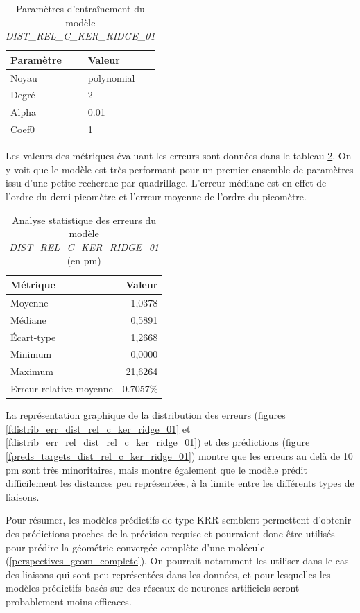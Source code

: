 \begin{table}
	\centering
	\begin{tabular}{|l|l|}
		\hline
		\textbf{Paramètre} & \textbf{Valeur} \\ \hline
		Noyau & polynomial \\ \hline
		Degré & 2 \\ \hline
		Alpha & 0.01 \\ \hline
		Coef0 & 1 \\ \hline
	\end{tabular}		
	\caption{Paramètres d'entraînement du modèle \emph{DIST\_REL\_C\_KER\_RIDGE\_01}}
	\label{tparams_dist_rel_c_ker_ridge_01}
\end{table}

\par Les valeurs des métriques évaluant les erreurs sont données dans le tableau \ref{tstats_dist_rel_c_ker_ridge_01}. On y voit que le modèle est très performant pour un premier ensemble de paramètres issu d'une petite recherche par quadrillage. L'erreur médiane est en effet de l'ordre du demi picomètre et l'erreur moyenne de l'ordre du picomètre.

\begin{table}
	\centering
	\begin{tabular}{|l|r|}
		\hline
		\textbf{Métrique} & \textbf{Valeur} \\ \hline
		Moyenne & 1,0378 \\ \hline
		Médiane & 0,5891 \\ \hline
		Écart-type & 1,2668 \\ \hline
		Minimum & 0,0000 \\ \hline
		Maximum & 21,6264\\ \hline
		Erreur relative moyenne & 0.7057\% \\ \hline
	\end{tabular}
	
	\caption{Analyse statistique des erreurs du modèle \emph{DIST\_REL\_C\_KER\_RIDGE\_01} (en pm)}
	\label{tstats_dist_rel_c_ker_ridge_01}
\end{table}

\par La représentation graphique de la distribution des erreurs (figures \ref{fdistrib_err_dist_rel_c_ker_ridge_01} et \ref{fdistrib_err_rel_dist_rel_c_ker_ridge_01}) et des prédictions (figure \ref{fpreds_targets_dist_rel_c_ker_ridge_01}) montre que les erreurs au delà de 10 pm sont très minoritaires, mais montre également que le modèle prédit difficilement les distances peu représentées, à la limite entre les différents types de liaisons.
\par Pour résumer, les modèles prédictifs de type KRR semblent permettent d'obtenir des prédictions proches de la précision requise et pourraient donc être utilisés pour prédire la géométrie convergée complète d'une molécule (\ref{perspectives_geom_complete}). On pourrait notamment les utiliser dans le cas des liaisons qui sont peu représentées dans les données, et pour lesquelles les modèles prédictifs basés sur des réseaux de neurones artificiels seront probablement moins efficaces.

